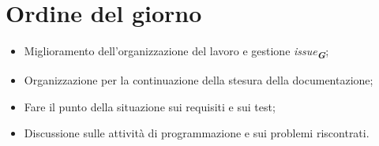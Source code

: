 

\section{Ordine del giorno}

\begin{itemize}
    \item Miglioramento dell'organizzazione del lavoro e gestione \emph{issue}\textsubscript{\textit{\textbf{G}}};
    \item Organizzazione per la continuazione della stesura della documentazione;
    \item Fare il punto della situazione sui requisiti e sui test;
    \item Discussione sulle attività di programmazione e sui problemi riscontrati.
\end{itemize}